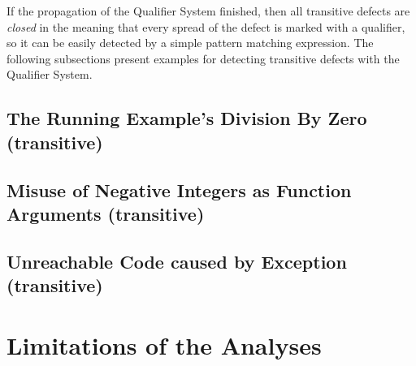 If the propagation of the Qualifier System finished, then all transitive defects are \emph{closed} in the meaning that every spread of the defect is marked with a qualifier, so it can be easily detected by a simple pattern matching expression. The following subsections present examples for detecting transitive defects with the Qualifier System.


\subsection{The Running Example's Division By Zero (transitive)}

\subsection{Misuse of Negative Integers as Function Arguments (transitive)}

\subsection{Unreachable Code caused by Exception (transitive)}


\section{Limitations of the Analyses}